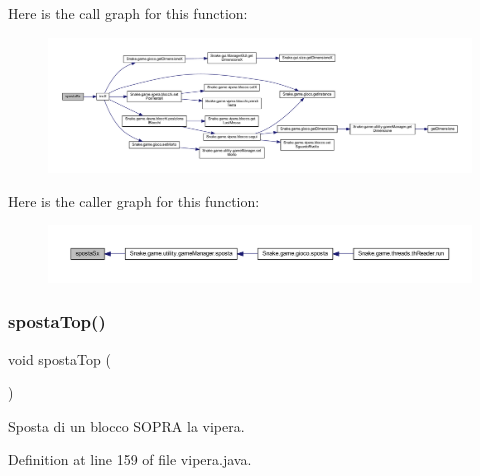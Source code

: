 Here is the call graph for this function\+:
\nopagebreak
\begin{figure}[H]
\begin{center}
\leavevmode
\includegraphics[width=350pt]{class_snake_1_1game_1_1vipera_1_1vipera_a1f636041d5b342db6f92850f6d19da55_cgraph}
\end{center}
\end{figure}
Here is the caller graph for this function\+:
\nopagebreak
\begin{figure}[H]
\begin{center}
\leavevmode
\includegraphics[width=350pt]{class_snake_1_1game_1_1vipera_1_1vipera_a1f636041d5b342db6f92850f6d19da55_icgraph}
\end{center}
\end{figure}
\mbox{\label{class_snake_1_1game_1_1vipera_1_1vipera_a43993392ddd2cba04e0df6312742f235}} 
\subsubsection{\texorpdfstring{sposta\+Top()}{spostaTop()}}
{\footnotesize\ttfamily void sposta\+Top (\begin{DoxyParamCaption}{ }\end{DoxyParamCaption})}



Sposta di un blocco S\+O\+P\+RA la vipera. 



Definition at line 159 of file vipera.\+java.

